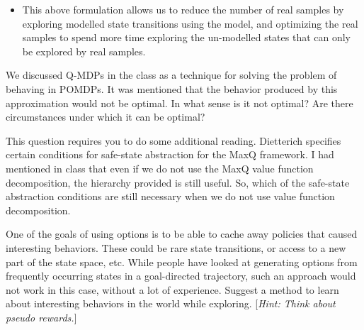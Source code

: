 \documentclass[addpoints,12pt,solution]{exam}
\begin{document}
\begin{questions}
\begin{solution}
\begin{itemize}
                \item This above formulation allows us to reduce the number of real samples by exploring modelled state transitions using the model,
                and optimizing the real samples to spend more time exploring the un-modelled states that can only be explored by real samples.
            \end{itemize}

        \end{solution}

        \question[4] We discussed Q-MDPs in the class as a technique for solving the problem of behaving in POMDPs. It was mentioned that the behavior produced by this approximation would not be optimal. In what sense is it not optimal? Are there circumstances under which it can be optimal?

        \begin{solution}

        \end{solution}

        \question[3] This question requires you to do some additional reading. Dietterich specifies certain conditions for safe-state abstraction for the MaxQ framework. I had mentioned in class that even if we do not use the MaxQ value function decomposition, the hierarchy provided is still useful. So, which of the safe-state abstraction conditions are still necessary when we do not use value function decomposition.
        \begin{solution}


        \end{solution}

        \question[4] One of the goals of using options is to be able to cache away policies that caused interesting behaviors. These could be rare state transitions, or access to a new part of the state space, etc. While people have looked at generating options from frequently occurring states in a goal-directed trajectory, such an approach would not work in this case, without a lot of experience. Suggest a method to learn about interesting behaviors in the world while exploring. [\textit{Hint: Think about pseudo rewards.}]
        \begin{solution}

        \end{solution}

    \end{questions}
\end{document}
